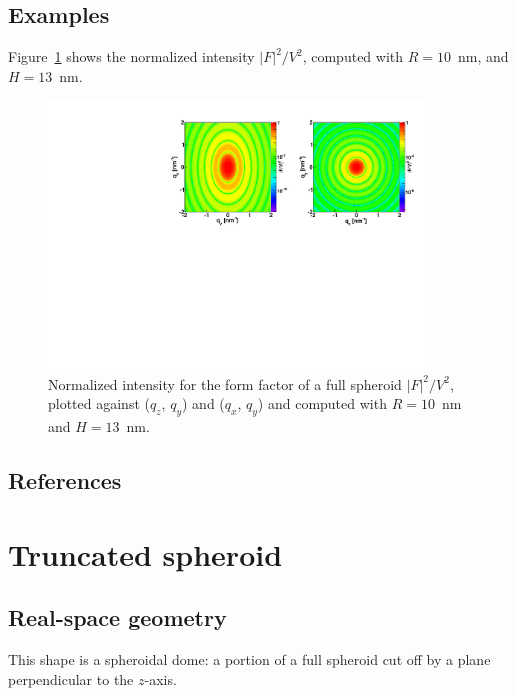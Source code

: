 \subsection{Examples}
Figure~\ref{figFFfspheroidEx} shows the normalized intensity
$|F|^2/V^2$, computed with $R=10$~nm, and $H=13$~nm.
\begin{figure}[h]
\begin{center}
\includegraphics[width=0.9\textwidth]{Figures/figfffspheroid}
\end{center}
\caption{Normalized intensity for the form factor of a full spheroid
  $|F|^2/V^2$, plotted against ($q_z$, $q_y$) and ($q_x$, $q_y$) and
  computed with $R=10$~nm and $H=13$~nm.}
\label{figFFfspheroidEx}
\end{figure}


\subsection{References}

\newpage{\cleardoublepage}

\section{Truncated spheroid} 

\subsection{Real-space geometry}
This shape is a spheroidal dome: a portion of a full spheroid cut off
by a plane perpendicular to the $z$-axis.

